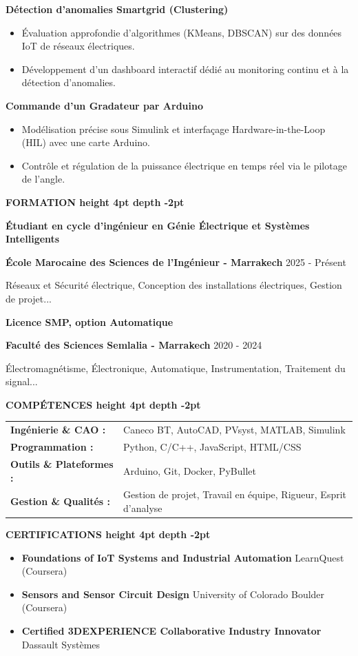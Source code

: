 \documentclass[10pt,a4paper]{altacv}
\renewcommand{\cvsection}[2][]{%
  \medskip%
  {\color{heading}\LARGE\bfseries #2 \hspace{0.2em}\leaders\vrule height 4pt depth -2pt\hfill\mbox{}}\par\smallskip
}
\renewcommand{\cvevent}[4]{%
  {\large\bfseries\color{accent}#1\par}
  \smallskip\normalsize
  \ifstrequal{#2}{}{}{%
    \textbf{\color{emphasis}#2\ifstrequal{#4}{}{}{ - #4}}%
  }%
  \hfill
  \ifstrequal{#3}{}{}{{\small#3}}%
  \par\smallskip
}
\begin{document}
{\large\bfseries\color{accent} Détection d'anomalies Smartgrid (Clustering)}\\[0.05cm]
\begin{itemize}
  \item Évaluation approfondie d'algorithmes (KMeans, DBSCAN) sur des données IoT de réseaux électriques.
  \item Développement d'un dashboard interactif dédié au monitoring continu et à la détection d'anomalies.
\end{itemize}

{\large\bfseries\color{accent} Commande d'un Gradateur par Arduino}\\[0.05cm]
\begin{itemize}
  \item Modélisation précise sous Simulink et interfaçage Hardware-in-the-Loop (HIL) avec une carte Arduino.
  \item Contrôle et régulation de la puissance électrique en temps réel via le pilotage de l'angle.
\end{itemize}


\cvsection{FORMATION}
\cvevent{Étudiant en cycle d'ingénieur en Génie Électrique et Systèmes Intelligents}{École Marocaine des Sciences de l'Ingénieur}{2025 - Présent}{Marrakech}
\small Réseaux et Sécurité électrique, Conception des installations électriques, Gestion de projet...

\cvevent{Licence SMP, option Automatique}{Faculté des Sciences Semlalia}{2020 - 2024}{Marrakech}
\small Électromagnétisme, Électronique, Automatique, Instrumentation, Traitement du signal...

\cvsection{COMPÉTENCES}
\begin{tabular}{@{}ll@{}}
\textbf{Ingénierie \& CAO :} & Caneco BT, AutoCAD, PVsyst, MATLAB, Simulink \\[1pt]
\textbf{Programmation :} & Python, C/C++, JavaScript, HTML/CSS \\[1pt]
\textbf{Outils \& Plateformes :} & Arduino, Git, Docker, PyBullet \\[1pt]
\textbf{Gestion \& Qualités :} & Gestion de projet, Travail en équipe, Rigueur, Esprit d'analyse \\
\end{tabular}

\cvsection{CERTIFICATIONS}
\begin{itemize}[leftmargin=*, label=\textbullet, itemsep=2pt]
  \item \textbf{Foundations of IoT Systems and Industrial Automation} \hfill {\color{emphasis}LearnQuest (Coursera)}
  \item \textbf{Sensors and Sensor Circuit Design} \hfill {\color{emphasis}University of Colorado Boulder (Coursera)}
  \item \textbf{Certified 3DEXPERIENCE Collaborative Industry Innovator} \hfill {\color{emphasis}Dassault Systèmes}

\end{itemize}
\end{document}
